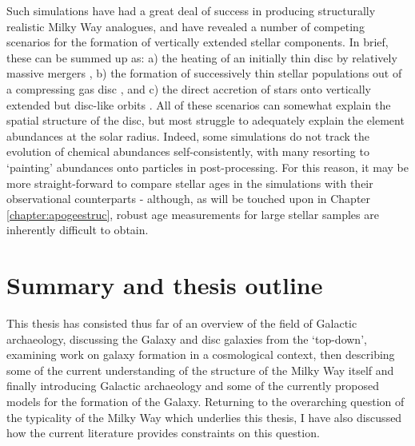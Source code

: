  Such simulations have had a great deal of success in producing structurally realistic Milky Way analogues, and have revealed a number of competing scenarios for the formation of vertically extended stellar components. In brief, these can be summed up as: a) the heating of an initially thin disc by relatively massive mergers \citep[e.g.][]{2004ApJ...612..894B,2008MNRAS.391.1806V,2009ApJ...700.1896K,2013A&A...558A...9M}, b) the formation of successively thin stellar populations out of a compressing gas disc \citep[e.g.][]{2013ApJ...773...43B,2017arXiv170901040N}, and c) the direct accretion of stars onto vertically extended but disc-like orbits \citep[e.g.][]{2003ApJ...597...21A}. All of these scenarios can somewhat explain the spatial structure of the disc, but most struggle to adequately explain the element abundances at the solar radius. Indeed, some simulations do not track the evolution of chemical abundances self-consistently, with many resorting to `painting' abundances onto particles in post-processing. For this reason, it may be more straight-forward to compare stellar ages in the simulations with their observational counterparts - although, as will be touched upon in Chapter \ref{chapter:apogeestruc}, robust age measurements for large stellar samples are inherently difficult to obtain.
 
\section{Summary and thesis outline}

This thesis has consisted thus far of an overview of the field of Galactic archaeology, discussing the Galaxy and disc galaxies from the `top-down', examining work on galaxy formation in a cosmological context, then describing some of the current understanding of the structure of the Milky Way itself and finally introducing Galactic archaeology and some of the currently proposed models for the formation of the Galaxy. Returning to the overarching question of the typicality of the Milky Way which underlies this thesis, I have also discussed how the current literature provides constraints on this question. 

